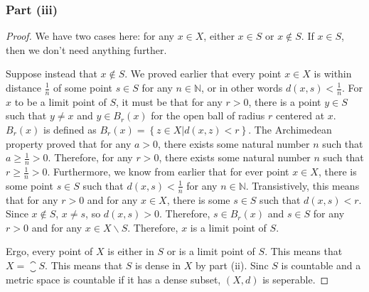 \documentclass[11pt]{article}
\begin{document}
        \subsubsection{Part (iii)}
            \begin{proof}
                We have two cases here: for any $x \in X$, either $x \in S$ or $x \notin S$.
                If $x \in S$, then we don't need anything further.

                Suppose instead that $x \notin S$.
                We proved earlier that every point $x \in X$ is within distance $\frac{1}{n}$ of some point $s \in S$ for any $n \in \mathbb{N}$, or in other words $d(x,s) < \frac{1}{n}$.
                For $x$ to be a limit point of $S$, it must be that for any $r > 0$, there is a point $y \in S$ such that $y \neq x$ and $y \in B_r(x)$ for the open ball of radius $r$ centered at $x$.
                $B_r(x)$ is defined as $B_r(x) = \left\{ z \in X \Big| d(x,z) < r \right\}$.
                The Archimedean property proved that for any $a > 0$, there exists some natural number $n$ such that $a \geq \frac{1}{n} > 0$.
                Therefore, for any $r > 0$, there exists some natural number $n$ such that $r \geq \frac{1}{n} > 0$.
                Furthermore, we know from earlier that for ever point $x \in X$, there is some point $s \in S$ such that $d(x,s) < \frac{1}{n}$ for any $n \in \mathbb{N}$.
                Transistively, this means that for any $r > 0$ and for any $x \in X$, there is some $s \in S$ such that $d(x,s) < r$.
                Since $x \notin S$, $x \neq s$, so $d(x,s) > 0$.
                Therefore, $s \in B_r(x)$ and $s \in S$ for any $r > 0$ and for any $x \in X \backslash S$.
                Therefore, $x$ is a limit point of $S$.
                
                Ergo, every point of $X$ is either in $S$ or is a limit point of $S$.
                This means that $X = \closure{S}$.
                This means that $S$ is dense in $X$ by part (ii).
                Sinc $S$ is countable and a metric space is countable if it has a dense subset, $(X,d)$ is seperable.
            \end{proof}

\pagebreak
\end{document}
